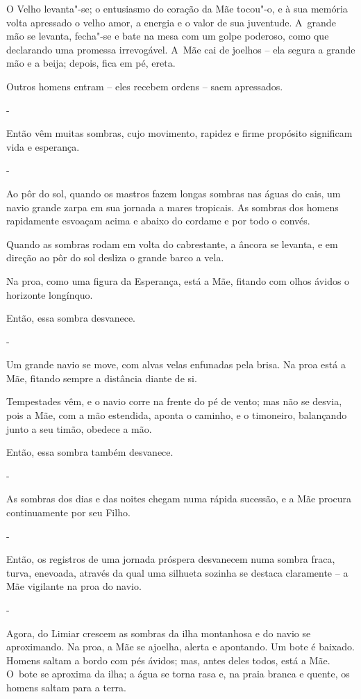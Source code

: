 O Velho levanta"-se; o entusiasmo do coração da Mãe tocou"-o, e à sua
memória volta apressado o velho amor, a energia e o valor de sua
juventude. A~grande mão se levanta, fecha"-se e bate na mesa com um golpe
poderoso, como que declarando uma promessa irrevogável. A~Mãe cai de
joelhos -- ela segura a grande mão e a beija; depois, fica em pé, ereta.

Outros homens entram -- eles recebem ordens -- saem apressados.

-

Então vêm muitas sombras, cujo movimento, rapidez e firme propósito
significam vida e esperança.

-

Ao pôr do sol, quando os mastros fazem longas sombras nas águas do cais,
um navio grande zarpa em sua jornada a mares tropicais. As sombras dos
homens rapidamente esvoaçam acima e abaixo do cordame e por todo o
convés.

Quando as sombras rodam em volta do cabrestante, a âncora se levanta, e
em direção ao pôr do sol desliza o grande barco a vela.

Na proa, como uma figura da Esperança, está a Mãe, fitando com olhos
ávidos o horizonte longínquo.

Então, essa sombra desvanece.

-

Um grande navio se move, com alvas velas enfunadas pela brisa. Na proa
está a Mãe, fitando sempre a distância diante de si.

Tempestades vêm, e o navio corre na frente do pé de vento; mas não se
desvia, pois a Mãe, com a mão estendida, aponta o caminho, e o
timoneiro, balançando junto a seu timão, obedece a mão.

Então, essa sombra também desvanece.

-

As sombras dos dias e das noites chegam numa rápida sucessão, e a Mãe
procura continuamente por seu Filho.

-

Então, os registros de uma jornada próspera desvanecem numa sombra
fraca, turva, enevoada, através da qual uma silhueta sozinha se destaca
claramente -- a Mãe vigilante na proa do navio.

-

Agora, do Limiar crescem as sombras da ilha montanhosa e do navio se
aproximando. Na proa, a Mãe se ajoelha, alerta e apontando. Um bote é
baixado. Homens saltam a bordo com pés ávidos; mas, antes deles todos,
está a Mãe. O~bote se aproxima da ilha; a água se torna rasa e, na praia
branca e quente, os homens saltam para a terra.

